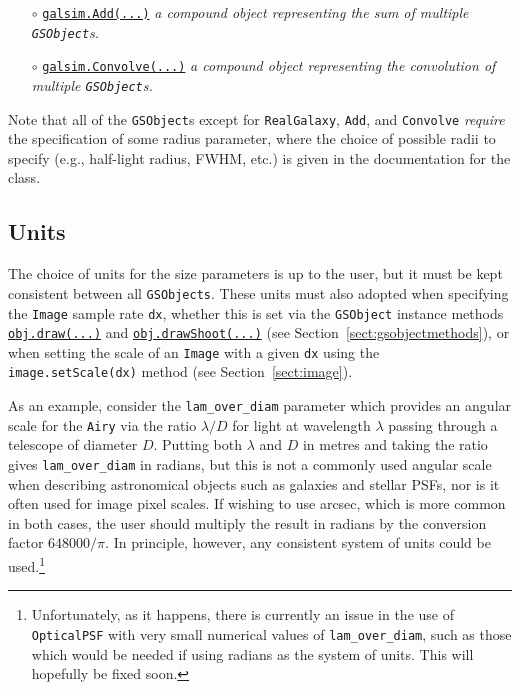 \documentclass[preprint,11pt]{aastex}
\begin{document}
\begin{itemize}
\item[$\circ$]
  \href{http://galsim-developers.github.com/GalSim/classgalsim_1_1base_1_1_add.html}{\texttt{galsim.Add(...)}}
  \newline \emph{a \emph{compound} object representing the sum of 
  multiple \texttt{GSObject}s.}
\item[$\circ$]
  \href{http://galsim-developers.github.com/GalSim/classgalsim_1_1base_1_1_convolve.html}{\texttt{galsim.Convolve(...)}}
  \newline \emph{a \emph{compound} object representing the convolution of 
multiple \texttt{GSObject}s.}
\end{itemize}

Note that all of the \texttt{GSObject}s except for \texttt{RealGalaxy}, \texttt{Add}, and
\texttt{Convolve} {\em require} the specification of some radius parameter, where the choice of
possible radii to specify (e.g., half-light radius, FWHM, etc.) is given in the documentation for
the class.

\subsection{Units}
The choice of units for the size parameters is up to the user,
but it must be kept consistent between all \texttt{GSObjects}.  These
units must also adopted when specifying the \texttt{Image} sample
rate \texttt{dx}, whether this is set via the \texttt{GSObject}
instance methods \href{http://galsim-developers.github.com/GalSim/classgalsim_1_1base_1_1_g_s_object.html#ae0b346a8b438dedbc7f60a52220869d8}{\texttt{obj.draw(...)}}
and
\href{http://galsim-developers.github.com/GalSim/classgalsim_1_1base_1_1_g_s_object.html#a42ac334d2840ba3fa832988e998beca0}{\texttt{obj.drawShoot(...)}}
(see Section~\ref{sect:gsobjectmethods}),
or when setting the scale of an \texttt{Image} with a given
\texttt{dx} using the \texttt{image.setScale(dx)} method (see Section~\ref{sect:image}).

As an example, consider the
\texttt{lam\_over\_diam} parameter which provides an angular scale for
the \texttt{Airy} via
the ratio $\lambda / D$ for light at wavelength $\lambda$ passing
through a telescope of diameter $D$. Putting both $\lambda$ and
$D$ in metres and taking the ratio gives \texttt{lam\_over\_diam} in
radians, but this is not a commonly used angular scale when describing
astronomical objects such as galaxies and stellar PSFs, nor is
it often used for image pixel scales.  If wishing to use arcsec, which
is more common in both cases, the user should multiply the result in
radians by the conversion factor
$648000 / \pi$.  In principle, however, any consistent
system of units could be used.\footnote{Unfortunately, as it happens, there is
  currently an issue in the use of \texttt{OpticalPSF} with very small
  numerical values
  of \texttt{lam\_over\_diam}, such as those which would be needed if using
  radians as the system of units.  This will hopefully be fixed soon.}
\end{document}
